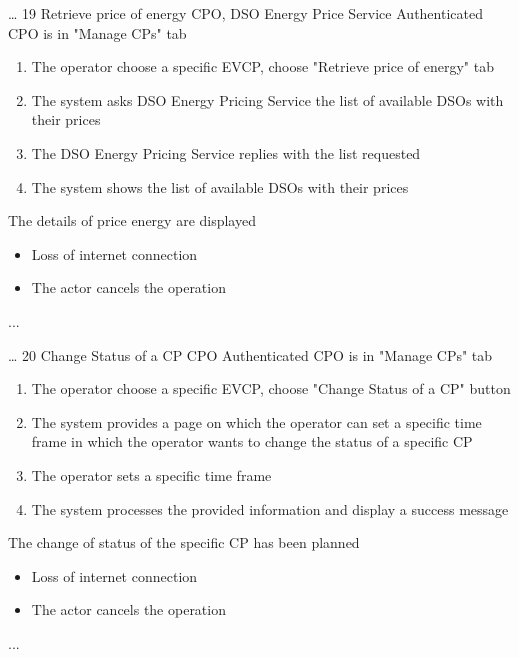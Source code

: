 \usecase
{
    \dots %
}
{19}
{Retrieve price of energy} %
{CPO, DSO Energy Price Service} %
{Authenticated CPO is in "Manage CPs" tab} %
{ %
    \begin{enumerate}
        \item The operator choose a specific EVCP, choose "Retrieve price of energy" tab
        \item The system asks DSO Energy Pricing Service the list of available DSOs with their prices
        \item The DSO Energy Pricing Service replies with the list requested
        \item The system shows the list of available DSOs with their prices
    \end{enumerate}
}
{The details of price energy are displayed} %
{ %
    \begin{itemize}
        \item Loss of internet connection
        \item The actor cancels the operation
    \end{itemize}
}
{ %
    ...
}

\usecase
{
    \dots %
}
{20}
{Change Status of a CP} %
{CPO} %
{Authenticated CPO is in "Manage CPs" tab} %
{ %
    \begin{enumerate}
        \item The operator choose a specific EVCP, choose "Change Status of a CP" button
        \item The system provides a page on which the operator can set a specific time frame in which the operator wants to change the status of a specific CP
        \item The operator sets a specific time frame
        \item The system processes the provided information and display a success message
    \end{enumerate}
}
{The change of status of the specific CP has been planned} %
{ %
    \begin{itemize}
        \item Loss of internet connection
        \item The actor cancels the operation
    \end{itemize}
}
{ %
    ...
}

